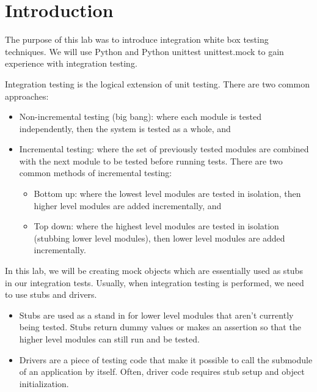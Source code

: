 \documentclass[12pt, letterpaper, titlepage]{article}
\title{\textbf{\Huge{
    \begin{center}
        ECE 322 Lab Report \#4
    \end{center}
}}}
\author{
\B enjamin Kong \\
1573684 \\
}
\begin{document}
 
\onehalfspacing

\maketitle
\newpage

\section*{Introduction}
The purpose of this lab was to introduce integration white box testing techniques. We will use Python and Python unittest unittest.mock to gain experience with integration testing.

Integration testing is the logical extension of unit testing. There are two common approaches:
\begin{itemize}
    \item Non-incremental testing (big bang): where each module is tested independently, then the system is tested as a whole, and
    \item Incremental testing: where the set of previously tested modules are combined with the next module to be tested before running tests. There are two common methods of incremental testing:
    \begin{itemize}
        \item Bottom up: where the lowest level modules are tested in isolation, then higher level modules are added incrementally, and
        \item Top down: where the highest level modules are tested in isolation (stubbing lower level modules), then lower level modules are added incrementally.
    \end{itemize}
\end{itemize}

In this lab, we will be creating mock objects which are essentially used as stubs in our integration tests. Usually, when integration testing is performed, we need to use stubs and drivers.
\begin{itemize}
    \item Stubs are used as a stand in for lower level modules that aren't currently being tested. Stubs return dummy values or makes an assertion so that the higher level modules can still run and be tested.
    \item Drivers are a piece of testing code that make it possible to call the submodule of an application by itself. Often, driver code requires stub setup and object initialization. 
\end{itemize}
\end{document}
